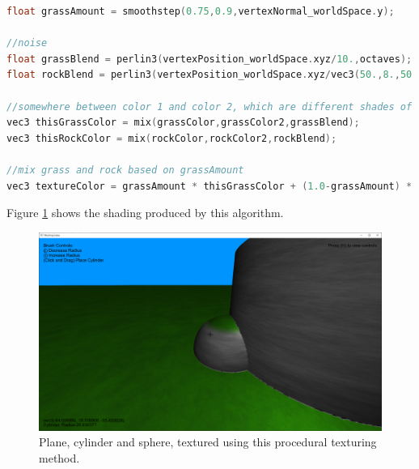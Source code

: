 \documentclass{article}
\begin{document}
\begin{lstlisting}[language=C++,label={procedural_shading},caption={Part of the fragment shader used to determine the color of each pixel. We use noise to interpolate between different shades of a color, rather than using a flat color. The variable \texttt{grassAmount} determines how much grass is visible at a given point, ranging from no grass when the y component of the normal is less than 0.75, to all grass, when the y component is greater than 0.9. The noise used to define the rock colour has been stretched in the x and z directions. The result is a color that changes more quickly as the y coordinate changes.}]
float grassAmount = smoothstep(0.75,0.9,vertexNormal_worldSpace.y);

//noise
float grassBlend = perlin3(vertexPosition_worldSpace.xyz/10.,octaves);
float rockBlend = perlin3(vertexPosition_worldSpace.xyz/vec3(50.,8.,50.),octaves);

//somewhere between color 1 and color 2, which are different shades of green, gray respectively
vec3 thisGrassColor = mix(grassColor,grassColor2,grassBlend);
vec3 thisRockColor = mix(rockColor,rockColor2,rockBlend);

//mix grass and rock based on grassAmount
vec3 textureColor = grassAmount * thisGrassColor + (1.0-grassAmount) * thisRockColor;    
\end{lstlisting}
Figure \ref{fig:procedural_shading_shapes} shows the shading produced by this algorithm.
\begin{figure}[H]
  \includegraphics[width=\textwidth]{procedural_shading_shapes.png}
  \caption{Plane, cylinder and sphere, textured using this procedural texturing method.}
  \label{fig:procedural_shading_shapes}
\end{figure}
\end{document}
